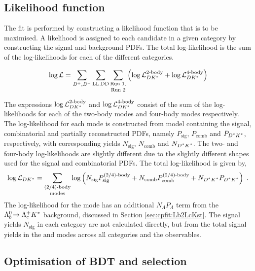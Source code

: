 \subsection{Likelihood function}
\label{sec:cpfit:likelihood}

The \CP fit is performed by constructing a likelihood function that is to be maximised. A likelihood is assigned to each candidate in a given category by constructing the signal and background PDFs. The total log-likelihood is the sum of the log-likelihoods for each of the different categories.

\begin{equation}
\log\mathcal{L} = \sum_{{{{B}^+}},{{{B}^-}}}\sum_{\text{LL,DD}}\mathop{\sum_{\text{Run 1,}}}_{\text{Run 2}} \left( \log\mathcal{L}_{{D}{{K}^*}}^{\text{2-body}} + \log\mathcal{L}_{{D}{{K}^*}}^{\text{4-body}} \right)
\end{equation}

The expressions $\log\mathcal{L}_{{D}{{K}^*}}^{\text{2-body}}$ and $\log\mathcal{L}_{{D}{{K}^*}}^{\text{4-body}}$ consist of the sum of the log-likelihoods for each of the two-body modes and four-body modes respectively. The log-likelihood for each mode is constructed from model containing the signal, combinatorial and partially reconstructed PDFs, namely $P_{\text{sig}}$, $P_{\text{comb}}$ and $P_{\text{\Dstar\Kstar}}$, respectively, with corresponding yields $N_{\text{sig}}$, $N_{\text{comb}}$ and $N_{\text{\Dstar\Kstar}}$. The two- and four-body log-likelihoods are slightly different due to the slightly different shapes used for the signal and combinatorial PDFs. The total log-likelihood is given by,
\begin{equation}
\log\mathcal{L}_{\D\Kstar} = \mathop{\sum_{\text{(2/4)-body}}}_{\text{modes}} \log\left(N_{\text{sig}}P_{\text{sig}}^{\text{(2/4)-body}} + N_{\text{comb}}P_{\text{comb}}^{\text{(2/4)-body}} + N_{\text{\Dstar\Kstar}}P_{\text{\Dstar\Kstar}}\right) \text{ .}
\label{likelihood}
\end{equation}
The log-likelihood for  the \kk mode has an additional $N_{\Lambda}P_{\Lambda}$ term from the ${{\Lambda}^0_{b}}\!\rightarrow {\ensuremath{{\Lambda}^+_{c}}}{\ensuremath{{K}^*}}$ background, discussed in Section \ref{sec:cpfit:Lb2LcKst}. The signal yields $N_{\text{sig}}$ in each category are not calculated directly, but from the total signal yields in the \kpi and \kpipipi modes across all categories and the \CP observables.

\subsection{Optimisation of BDT and \Kstar selection}
\label{sec:cpfit:optimisation}

